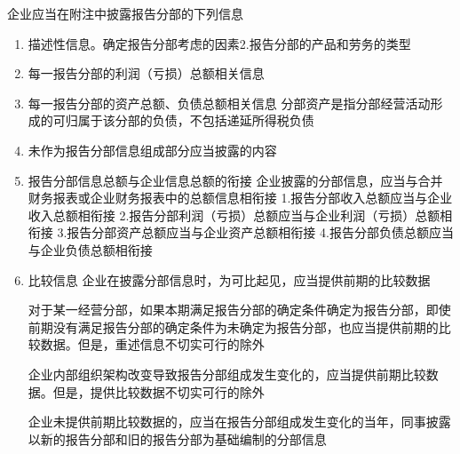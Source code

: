 \documentclass[UTF8,12pt]{ctexart}
\numberwithin{equation}{section} %
\numberwithin{figure}{section}
\numberwithin{table}{section}
\begin{document}
	企业应当在附注中披露报告分部的下列信息
	\begin{enumerate}
		\item 描述性信息。确定报告分部考虑的因素2.报告分部的产品和劳务的类型
		
		\item 每一报告分部的利润（亏损）总额相关信息
		
		\item 每一报告分部的资产总额、负债总额相关信息
		分部资产是指分部经营活动形成的可归属于该分部的负债，不包括递延所得税负债
		
		\item 未作为报告分部信息组成部分应当披露的内容
		
		\item 报告分部信息总额与企业信息总额的衔接
		企业披露的分部信息，应当与合并财务报表或企业财务报表中的总额信息相衔接
		1.报告分部收入总额应当与企业收入总额相衔接
		2.报告分部利润（亏损）总额应当与企业利润（亏损）总额相衔接
		3.报告分部资产总额应当与企业资产总额相衔接
		4.报告分部负债总额应当与企业负债总额相衔接
		
		\item 比较信息
		企业在披露分部信息时，为可比起见，应当提供前期的比较数据
		
		对于某一经营分部，如果本期满足报告分部的确定条件确定为报告分部，即使前期没有满足报告分部的确定条件为未确定为报告分部，也应当提供前期的比较数据。但是，重述信息不切实可行的除外
		
		企业内部组织架构改变导致报告分部组成发生变化的，应当提供前期比较数据。但是，提供比较数据不切实可行的除外
		
		企业未提供前期比较数据的，应当在报告分部组成发生变化的当年，同事披露以新的报告分部和旧的报告分部为基础编制的分部信息
		
	\end{enumerate}
\end{document}
